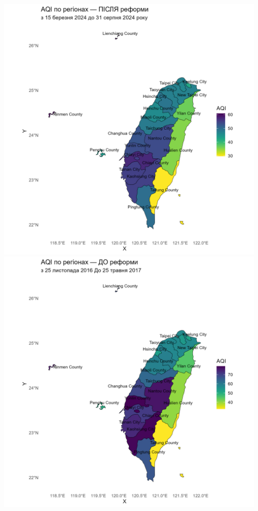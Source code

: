 \documentclass{article}
\begin{document}
\begin{enumerate}
    \includegraphics[width=6in]{question5/map_after_reform.png}
    \includegraphics[width=6in]{question5/map_before_reform.png}

\end{enumerate}
\end{document}

